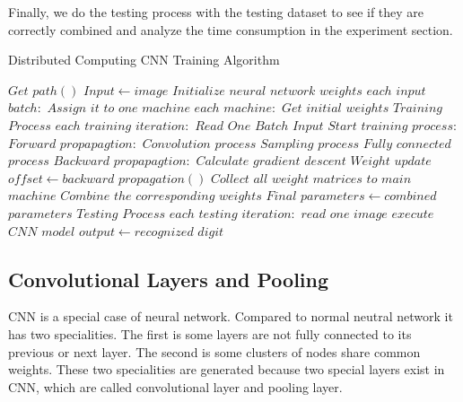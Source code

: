 Finally, we do the testing process with the testing dataset to see if they are correctly combined and analyze the time consumption in the experiment section.
\begin{algorithm}[t]
\caption{Distributed Computing CNN Training Algorithm}
\label{alg1}  %
\begin{algorithmic}[1]
\begin{codebox}
\li $Get$ $path()$
\li $Input \gets image$
\li $Initialize$ $neural$ $network$ $weights$
\li \For $each$ $input$ $batch:$
\li      \hspace*{1cm}$Assign$ $it$ $to$ $one$ $machine$ 
\End
\li \For $each$ $machine :$
\li      \hspace*{1cm}$Get$ $initial$ $weights$
\li      \hspace*{1cm}$Training$ $Process$
\li      \hspace*{1cm}\For $each$ $training$ $iteration:$
\li      \hspace*{2cm}$Read$ $One$ $Batch$ $Input$
\li      \hspace*{2cm}$Start$ $training$ $process :$
\li      \hspace*{3cm}$Forward$ $propapagtion:$
\li      \hspace*{3cm}$Convolution$ $process$
\li      \hspace*{3cm}$Sampling$ $process$
\li      \hspace*{3cm}$Fully$ $connected$ $process$
\li      \hspace*{2cm}$Backward$ $propapagtion:$
\li         \hspace*{3cm}$Calculate$ $gradient$ $descent$
\li         \hspace*{3cm}$Weight$ $update$
\li         \hspace*{2cm}$offset \gets backward$ $propagation()$ \End
\li $Collect$ $all$ $weight$ $matrices$ $to$ $main$ $machine$
\li $Combine$ $the$ $corresponding$ $weights$
\li $Final$ $parameters \gets combined$ $parameters$
\li $Testing$ $Process$
\li \For $each$ $testing$ $iteration:$
\li     \Do $read$ $one$ $image$
\li         $execute$ $CNN$ $model$
\li 		$output \gets recognized$ $digit$
\End
\end{codebox}
\end{algorithmic}
\end{algorithm}


\subsection{Convolutional Layers and Pooling}
CNN is a special case of neural network. Compared to normal neutral network it has two specialities. The first is some layers are not fully connected to its previous or next layer. The second is some clusters of nodes share common weights. These two specialities are generated because two special layers exist in CNN, which are called convolutional layer and pooling layer.

